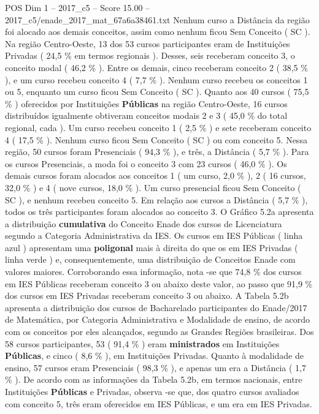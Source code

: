 \begin{textsample}{POS Dim 1 – 2017\_c5 – Score 15.00 – 2017\_c5/enade\_2017\_mat\_67a6a38461.txt}
Nenhum curso a Distância da região foi alocado aos demais conceitos, assim como nenhum ficou Sem Conceito ( SC ).
Na região Centro-Oeste, 13 dos 53 cursos participantes eram de Instituições Privadas ( 24,5 \% em termos regionais ).
Desses, seis receberam conceito 3, o conceito modal ( 46,2 \% ).
Entre os demais, cinco receberam conceito 2 ( 38,5 \% ), e um curso recebeu conceito 4 ( 7,7 \% ).
Nenhum curso recebeu os conceitos 1 ou 5, enquanto um curso ficou Sem Conceito ( SC ).
Quanto aos 40 cursos ( 75,5 \% ) oferecidos por Instituições \textbf{Públicas} na região Centro-Oeste, 16 cursos distribuídos igualmente obtiveram conceitos modais 2 e 3 ( 45,0 \% do total regional, cada ).
Um curso recebeu conceito 1 ( 2,5 \% ) e sete receberam conceito 4 ( 17,5 \% ).
Nenhum curso ficou Sem Conceito ( SC ) ou com conceito 5.
Nessa região, 50 cursos foram Presenciais ( 94,3 \% ), e três, a Distância ( 5,7 \% ).
Para os cursos Presenciais, a moda foi o conceito 3 com 23 cursos ( 46,0 \% ).
Os demais cursos foram alocados aos conceitos 1 ( um curso, 2,0 \% ), 2 ( 16 cursos, 32,0 \% ) e 4 ( nove cursos, 18,0 \% ).
Um curso presencial ficou Sem Conceito ( SC ), e nenhum recebeu conceito 5.
Em relação aos cursos a Distância ( 5,7 \% ), todos os três participantes foram alocados ao conceito 3.
O Gráfico 5.2a apresenta a distribuição \textbf{cumulativa} do Conceito Enade dos cursos de Licenciatura segundo a Categoria Administrativa da IES.
Os cursos em IES Públicas ( linha azul ) apresentam uma \textbf{poligonal} mais à direita do que os em IES Privadas ( linha verde ) e, consequentemente, uma distribuição de Conceitos Enade com valores maiores.
Corroborando essa informação, nota -se que 74,8 \% dos cursos em IES Públicas receberam conceito 3 ou abaixo deste valor, ao passo que 91,9 \% dos cursos em IES Privadas receberam conceito 3 ou abaixo.
A Tabela 5.2b apresenta a distribuição dos cursos de Bacharelado participantes do Enade/2017 de Matemática, por Categoria Administrativa e Modalidade de ensino, de acordo com os conceitos por eles alcançados, segundo as Grandes Regiões brasileiras.
Dos 58 cursos participantes, 53 ( 91,4 \% ) eram \textbf{ministrados} em Instituições \textbf{Públicas}, e cinco ( 8,6 \% ), em Instituições Privadas.
Quanto à modalidade de ensino, 57 cursos eram Presenciais ( 98,3 \% ), e apenas um era a Distância ( 1,7 \% ).
De acordo com as informações da Tabela 5.2b, em termos nacionais, entre Instituições \textbf{Públicas} e Privadas, observa -se que, dos quatro cursos avaliados com conceito 5, três eram oferecidos em IES Públicas, e um era em IES Privadas.

\end{textsample}
